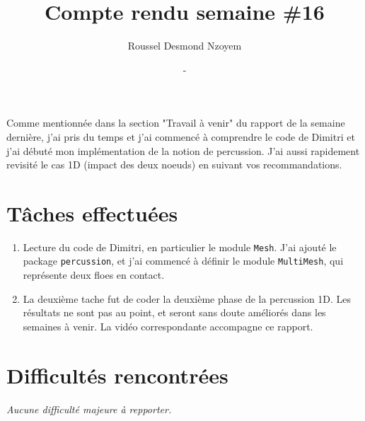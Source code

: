 \documentclass[
  french,
	11pt, %
]{fphw}
\title{\sf\bfseries Compte rendu semaine \#16} %
\author{Roussel Desmond Nzoyem} %
\date{\DTMdisplaydate{2021}{5}{19}{-1} - \DTMdisplaydate{2021}{5}{25}{-1}} %
\institute{Sorbonne Université \\ Laboratoire Jacques-Louis Lions} %
\begin{document}
\maketitle %


Comme mentionnée dans la section "Travail à venir" du rapport de la semaine dernière, j'ai pris du temps et j'ai commencé à comprendre le code de Dimitri et j'ai débuté mon implémentation de la notion de percussion. J'ai aussi rapidement revisité le cas 1D (impact des deux noeuds) en suivant vos recommandations.



\section*{Tâches effectuées}

\begin{enumerate}
  \item Lecture du code de Dimitri, en particulier le module \texttt{Mesh}. J'ai ajouté le package \texttt{percussion}, et j'ai commencé à définir le module \texttt{MultiMesh}, qui représente deux floes en contact. 
  \item La deuxième tache fut de coder la deuxième phase de la percussion 1D. Les résultats ne sont pas au point, et seront sans doute améliorés dans les semaines à venir. La vidéo correspondante accompagne ce rapport.
\end{enumerate}



\section*{Difficultés rencontrées}


\emph{Aucune difficulté majeure à repporter.}
\end{document}
